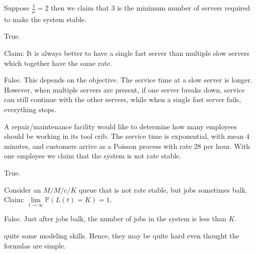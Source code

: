 \documentclass[stochastic-or.tex]{subfiles}
\begin{document}
\begin{truefalse}
    Suppose $\frac{\lambda}{\mu} = 2$ then we claim that 3 is the minimum number of servers required to make the system stable.
\begin{solution}
        True.
\end{solution}
\end{truefalse}

\begin{truefalse}
Claim: It is always better to have a single fast server than multiple slow servers which together have the same rate.
\begin{solution}
    False.
This depends on the objective.
The service time at a slow server is longer.
However, when multiple servers are present, if one server breaks down, service can still continue with the other servers, while when a single fast server fails, everything stops.
\end{solution}
\end{truefalse}

\begin{truefalse}
A repair/maintenance facility would like to determine how many employees should be working in its tool crib.
The service time is exponential, with mean 4 minutes, and customers arrive as a Poisson process with rate 28 per hour.
With one employee we claim that the system is not rate stable.
\begin{solution}
True.
\end{solution}
\end{truefalse}


\begin{truefalse}
Consider an $M/M/c/K$ queue that is not rate stable, but  jobs sometimes balk. Claim: $\lim\limits_{t\to\infty}\mathbb{P}(L(t)=K)=1$.
\begin{solution}
  False. Just after jobs balk, the number of jobs in the system is less than $K$.
\end{solution}
\end{truefalse}



 quite some modeling skills. Hence, they may be quite hard even thought the formulas are simple.
\end{document}
